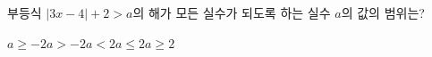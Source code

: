 부등식 $|3x-4|+2>a$의 해가 모든 실수가 되도록 하는 실수 $a$의 값의 범위는?
\begin{choices32}{$a\ge -2$}{$a>-2$}{$a<2$}{$a\le 2$}{$a\ge 2$}\end{choices32}
